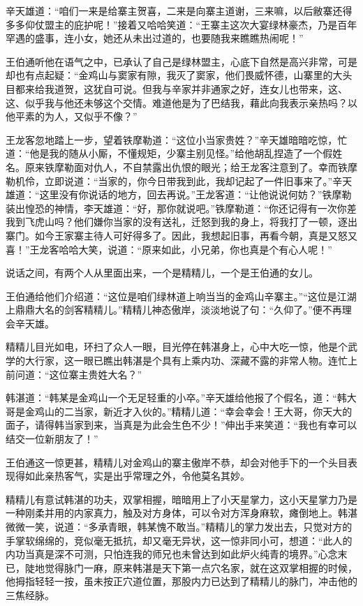 \documentclass[12pt,oneside]{book}
\begin{document}
辛天雄道：``咱们一来是给寨主贺喜，二来是向寨主道谢，三来嘛，以后敝寨还得多多仰仗盟主的庇护呢！''接着又哈哈笑道：``王寨主这次大宴绿林豪杰，乃是百年罕遇的盛事，连小女，她还从未出过道的，也要随我来瞧瞧热闹呢！''

王伯通听他在语气之中，已承认了自己是绿林盟主，心底下自然是高兴非常，可是却也有点起疑：``金鸡山与窦家有隙，我灭了窦家，他们畏威怀德，山寨里的大头目都来给我道贺，这犹自可说。但我与辛家并非通家之好，连女儿也带来，这、这、似乎我与他还未够这个交情。难道他是为了巴结我，藉此向我表示亲热吗？以他平素的为人，又似乎不像？''

王龙客忽地踏上一步，望着铁摩勒道：``这位小当家贵姓？''辛天雄暗暗吃惊，忙道：``他是我的随从小厮，不懂规矩，少寨主别见怪。''给他胡乱捏造了一个假姓名。原来铁摩勒面对仇人，不自禁露出仇恨的眼光；给王龙客注意到了。幸而铁摩勒机伶，立即说道：``当家的，你今日带我到此，我却记起了一件旧事来了。''辛天雄道：``这里没有你说话的地方，回去再说。''王龙客道：``让他说说何妨？''铁摩勒装出惶恐的神情，李天雄道：``好，那你就说吧。''铁摩勒道：``你还记得有一次你差我到飞虎山吗？他们嫌你当家的没有送礼，迁怒到我的身上，将我打了一顿，逐出寨门。如今王家寨主待人可好得多了。因此，我想起旧事，再看今朝，真是又怒又喜！''王龙客哈哈大笑，说道：``原来如此，小兄弟，你也真是个有心人呢！''

说话之间，有两个人从里面出来，一个是精精儿，一个是王伯通的女儿。

王伯通给他们介绍道：``这位是咱们绿林道上响当当的金鸡山辛寨主。''``这位是江湖上鼎鼎大名的剑客精精儿。''精精儿神态傲岸，淡淡地说了句：``久仰了。''便不再理会辛天雄。

精精儿目光如电，环扫了众人一眼，目光停在韩湛身上，心中大吃一惊，他是个武学的大行家，这一眼已瞧出韩湛是个具有上乘内功、深藏不露的非常人物。连忙上前问道：``这位寨主贵姓大名？''

韩湛道：``韩某是金鸡山一个无足轻重的小卒。''辛天雄给他报了个假名，道：``韩大哥是金鸡山的二当家，新近才入伙的。''精精儿道：``幸会幸会！王大哥，你天大的面子，请得韩当家到来，当真是为此会生色不少！''伸出手来笑道：``我也有幸可以结交一位新朋友了！''

王伯通这一惊更甚，精精儿对金鸡山的寨主傲岸不恭，却会对他手下的一个头目表现得如此亲热客气，实是出乎常理之外，令他莫名其妙。

精精儿有意试韩湛的功夫，双掌相握，暗暗用上了小天星掌力，这小天星掌力乃是一种刚柔并用的内家真力，触及对方身体，可以令对方浑身麻软，瘫倒地上。韩湛微微一笑，说道：``多承青眼，韩某愧不敢当。''精精儿的掌力发出去，只觉对方的手掌软绵绵的，竞似毫无抵抗，却又毫无异状，这一惊非同小可，想道：``此人的内功当真是深不可测，只怕连我的师兄也未曾达到如此炉火纯青的境界。''心念末已，陡地觉得脉门一麻，原来韩湛是天下第一点穴名家，就在这双掌相握的时候，他拇指轻轻一按，虽未按正穴道位置，那股内力已达到了精精儿的脉门，冲击他的三焦经脉。
\end{document}
